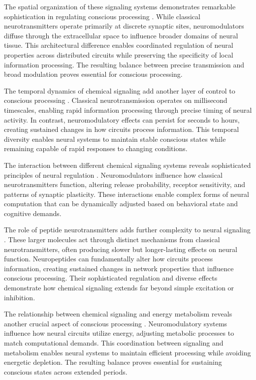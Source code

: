 \begin{refsection}
The spatial organization of these signaling systems demonstrates remarkable sophistication in regulating conscious processing \cite{Bargmann2012}. While classical neurotransmitters operate primarily at discrete synaptic sites, neuromodulators diffuse through the extracellular space to influence broader domains of neural tissue. This architectural difference enables coordinated regulation of neural properties across distributed circuits while preserving the specificity of local information processing. The resulting balance between precise transmission and broad modulation proves essential for conscious processing.

The temporal dynamics of chemical signaling add another layer of control to conscious processing \cite{Palacios-Filardo2019}. Classical neurotransmission operates on millisecond timescales, enabling rapid information processing through precise timing of neural activity. In contrast, neuromodulatory effects can persist for seconds to hours, creating sustained changes in how circuits process information. This temporal diversity enables neural systems to maintain stable conscious states while remaining capable of rapid responses to changing conditions.

The interaction between different chemical signaling systems reveals sophisticated principles of neural regulation \cite{Dayan2012}. Neuromodulators influence how classical neurotransmitters function, altering release probability, receptor sensitivity, and patterns of synaptic plasticity. These interactions enable complex forms of neural computation that can be dynamically adjusted based on behavioral state and cognitive demands.

The role of peptide neurotransmitters adds further complexity to neural signaling \cite{Nadim2014}. These larger molecules act through distinct mechanisms from classical neurotransmitters, often producing slower but longer-lasting effects on neural function. Neuropeptides can fundamentally alter how circuits process information, creating sustained changes in network properties that influence conscious processing. Their sophisticated regulation and diverse effects demonstrate how chemical signaling extends far beyond simple excitation or inhibition.

The relationship between chemical signaling and energy metabolism reveals another crucial aspect of conscious processing \cite{Marder2012}. Neuromodulatory systems influence how neural circuits utilize energy, adjusting metabolic processes to match computational demands. This coordination between signaling and metabolism enables neural systems to maintain efficient processing while avoiding energetic depletion. The resulting balance proves essential for sustaining conscious states across extended periods.


\end{refsection}
